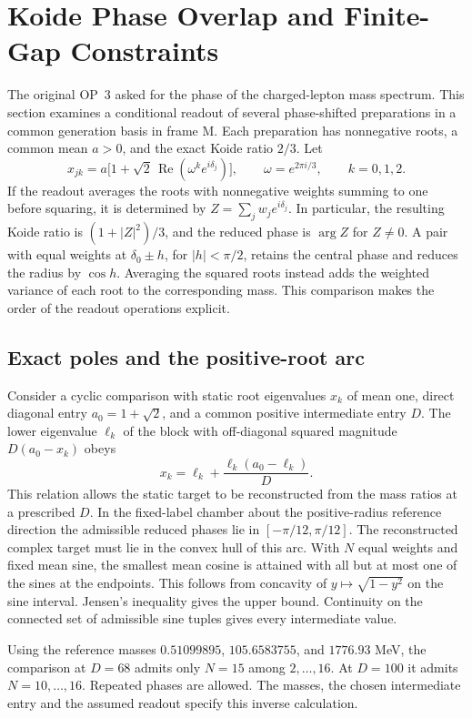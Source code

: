 \section{Koide Phase Overlap and Finite-Gap Constraints}
\label{sec:v4110-koide-overlap}

The original OP~3 asked for the phase of the charged-lepton mass
spectrum. This section examines a conditional readout of several
phase-shifted preparations in a common generation basis in frame M.
Each preparation has nonnegative roots, a common mean \(a>0\), and
the exact Koide ratio \(2/3\). Let
\[
 x_{jk}=a\bigl[1+\sqrt2\,\operatorname{Re}(\omega^k e^{i\delta_j})\bigr],
 \qquad \omega=e^{2\pi i/3},\qquad k=0,1,2.
\]
If the readout averages the roots with nonnegative weights summing to
one before squaring, it is determined by \(Z=\sum_j w_j e^{i\delta_j}\).
In particular, the resulting Koide ratio is \((1+|Z|^2)/3\), and the
reduced phase is \(\arg Z\) for \(Z\ne0\). A pair with equal weights
at \(\delta_0\pm h\), for \(|h|<\pi/2\), retains the central phase
and reduces the radius by \(\cos h\). Averaging the squared roots
instead adds the weighted variance of each root to the corresponding
mass. This comparison makes the order of the readout operations
explicit.

\subsection{Exact poles and the positive-root arc}

Consider a cyclic comparison with static root eigenvalues \(x_k\)
of mean one, direct diagonal entry \(a_0=1+\sqrt2\), and a common
positive intermediate entry \(D\). The lower eigenvalue \(\ell_k\)
of the block with off-diagonal squared magnitude \(D(a_0-x_k)\)
obeys
\[
 x_k=\ell_k+\frac{\ell_k(a_0-\ell_k)}{D}.
\]
This relation allows the static target to be reconstructed from the
mass ratios at a prescribed \(D\). In the fixed-label chamber about the
positive-radius reference direction the admissible reduced phases lie
in \([-\pi/12,\pi/12]\). The reconstructed complex target must lie in
the convex hull of this arc. With \(N\) equal weights and fixed mean sine,
the smallest mean cosine is attained with all but at most one of the
sines at the endpoints. This follows from concavity of
\(y\mapsto\sqrt{1-y^2}\) on the sine interval. Jensen's inequality gives
the upper bound. Continuity on the connected set of admissible sine
tuples gives every intermediate value.

Using the reference masses \(0.51099895\), \(105.6583755\), and
\(1776.93\) MeV, the comparison at \(D=68\) admits only \(N=15\) among
\(2,\ldots,16\). At \(D=100\) it admits \(N=10,\ldots,16\).
Repeated phases are allowed. The masses, the chosen intermediate
entry and the assumed readout specify this inverse calculation.

